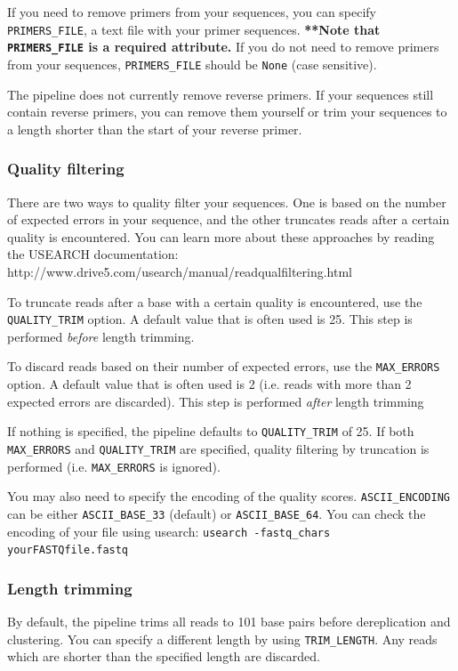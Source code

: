 \documentclass[11pt, oneside]{article}   	%
\begin{document}
If you need to remove primers from your sequences, you can specify 
\texttt{PRIMERS\_FILE}, a text file with your primer sequences.
\textbf{**Note that \texttt{PRIMERS\_FILE} is a 
required attribute.} If you do not need to remove primers from your sequences,
\texttt{PRIMERS\_FILE} should be \texttt{None} (case sensitive).

The pipeline does not currently remove reverse primers. If your sequences
still contain reverse primers, you can remove them yourself or trim your 
sequences to a length shorter than the start of your reverse primer.

\subsubsection{Quality filtering}

There are two ways to quality filter your sequences.
One is based on the number of expected errors in your sequence, and the other
truncates reads after a certain quality is encountered. You can learn more
about these approaches by reading the USEARCH documentation:
http://www.drive5.com/usearch/manual/readqualfiltering.html

To truncate reads after a base with a certain quality is encountered, use the
\texttt{QUALITY\_TRIM} option. A default value that is often used is 25.
This step is performed \textit{before} length trimming. 

To discard reads based on their number of expected errors, use the 
\texttt{MAX\_ERRORS} option. A default value that is often used is 2 (i.e.
reads with more than 2 expected errors are discarded). This step is
performed \textit{after} length trimming

If nothing is specified, the pipeline defaults to \texttt{QUALITY\_TRIM} of 25.
If both \texttt{MAX\_ERRORS} and \texttt{QUALITY\_TRIM} are specified,
quality filtering by truncation is performed (i.e. \texttt{MAX\_ERRORS} is
ignored).

You may also need to specify the encoding of the quality scores. \texttt{ASCII\_ENCODING} 
can be either \texttt{ASCII\_BASE\_33} (default) or \texttt{ASCII\_BASE\_64}.
You can check the encoding of your file using usearch: \texttt{usearch -fastq\_chars yourFASTQfile.fastq}

\subsubsection{Length trimming}

By default, the pipeline trims all reads to 101 base pairs before
dereplication and clustering. You can specify a different length by
using \texttt{TRIM\_LENGTH}. Any reads which are shorter than the specified
length are discarded.
\end{document}
